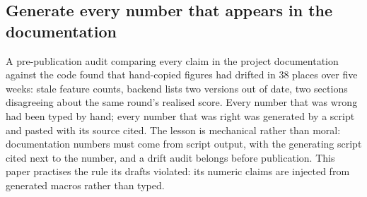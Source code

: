 \subsection{Generate every number that appears in the documentation}
\label{sec:lessons-generated-numbers}

A pre-publication audit comparing every claim in the project
documentation against the code found that hand-copied figures had
drifted in 38 places over five weeks: stale feature counts, backend
lists two versions out of date, two sections disagreeing about the
same round's realised score. Every number that was wrong had been
typed by hand; every number that was right was generated by a script
and pasted with its source cited. The lesson is mechanical rather than
moral: documentation numbers must come from script output, with the
generating script cited next to the number, and a drift audit belongs
before publication. This paper practises the rule its drafts violated:
its numeric claims are injected from generated macros rather than
typed.
